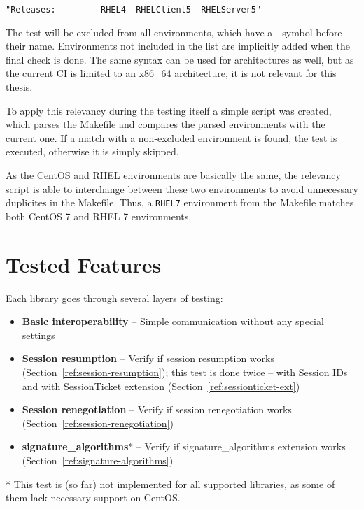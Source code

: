     \begin{lstlisting}
"Releases:        -RHEL4 -RHELClient5 -RHELServer5"
    \end{lstlisting}

    The test will be excluded from all environments, which have a - symbol
    before their name. Environments not included in the list are implicitly
    added when the final check is done. The same syntax can be used for
    architectures as well, but as the current CI is limited to an x86\_64
    architecture, it is not relevant for this thesis.

    To apply this relevancy during the testing itself a simple script was
    created, which parses the Makefile and compares the parsed environments
    with the current one. If a match with a non-excluded environment is found,
    the test is executed, otherwise it is simply skipped.

    As the CentOS and RHEL environments are basically the same, the relevancy
    script is able to interchange between these two environments to avoid
    unnecessary duplicites in the Makefile. Thus, a \texttt{RHEL7} environment
    from the Makefile matches both CentOS 7 and RHEL 7 environments.

\section{Tested Features}
    Each library goes through several layers of testing:

    \begin{itemize}
        \item \textbf{Basic interoperability} -- Simple communication without
            any special settings
        \item \textbf{Session resumption} -- Verify if session resumption works
            (Section~\ref{ref:session-resumption}); this test is done twice --
            with Session IDs and with SessionTicket
            extension (Section~\ref{ref:sessionticket-ext})
        \item \textbf{Session renegotiation} -- Verify if session renegotiation
            works (Section~\ref{ref:session-renegotiation})
        \item \textbf{signature\_algorithms}* -- Verify if signature\_algorithms
            extension works (Section~\ref{ref:signature-algorithms})
    \end{itemize}

    * This test is (so far) not implemented for all supported libraries, as
    some of them lack necessary support on CentOS. \\

